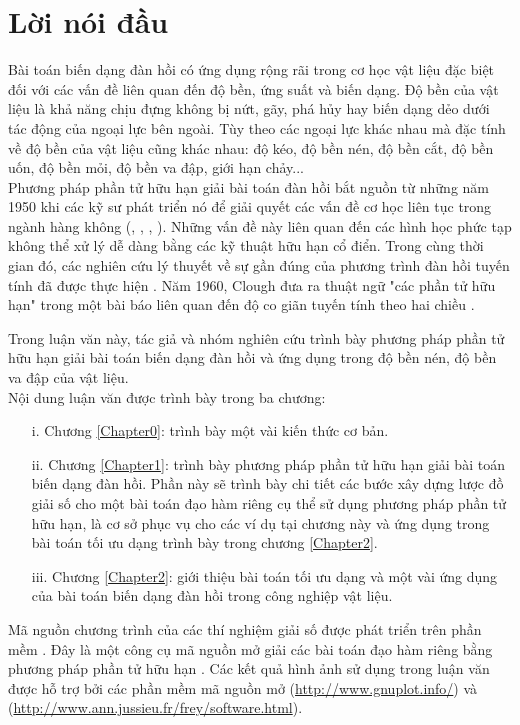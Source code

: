 \chapter*{\centering Lời nói đầu}
Bài toán biến dạng đàn hồi có ứng dụng rộng rãi trong cơ học vật liệu đặc biệt đối với các vấn đề liên quan đến độ bền, ứng suất và biến dạng. Độ bền của vật liệu là khả năng chịu đựng không bị nứt, gãy, phá hủy hay biến dạng dẻo dưới tác động của ngoại lực bên ngoài. Tùy theo các ngoại lực khác nhau mà đặc tính về độ bền của vật liệu cũng khác nhau: độ kéo, độ bền nén, độ bền cắt, độ bền uốn, độ bền mỏi, độ bền va đập, giới hạn chảy...\\
Phương pháp phần tử hữu hạn giải bài toán đàn hồi bắt nguồn từ những năm 1950 khi các kỹ sư phát triển nó để giải quyết các vấn đề cơ học liên tục trong ngành hàng không (\cite{Lev53}, \cite{ArK67}, \cite{ArK66}, \cite{Ode91}). Những vấn đề này liên quan đến các hình học phức tạp không thể xử lý dễ dàng bằng các kỹ thuật hữu hạn cổ điển. Trong cùng thời gian đó, các nghiên cứu lý thuyết về sự gần đúng của phương trình đàn hồi tuyến tính đã được thực hiện \cite{TuC56}. Năm 1960, Clough đưa ra thuật ngữ "các phần tử hữu hạn" trong một bài báo liên quan đến độ co giãn tuyến tính theo hai chiều \cite{Clo60}.

Trong luận văn này, tác giả và nhóm nghiên cứu trình bày phương pháp phần tử hữu hạn giải bài toán biến dạng đàn hồi và ứng dụng trong độ bền nén, độ bền va đập của vật liệu. \\[-0.5cm]

Nội dung luận văn được trình bày trong ba chương:
\begin{itemize}
\item[i.] Chương \ref{Chapter0}: trình bày một vài kiến thức cơ bản.
\item[ii.] Chương \ref{Chapter1}: trình bày phương pháp phần tử hữu hạn giải bài toán biến dạng đàn hồi. Phần này sẽ trình bày chi tiết các bước xây dựng lược đồ giải số cho một bài toán đạo hàm riêng cụ thể sử dụng phương pháp phần tử hữu hạn, là cơ sở phục vụ cho các ví dụ tại chương này và ứng dụng trong bài toán tối ưu dạng trình bày trong chương \ref{Chapter2}.
\item[iii.] Chương \ref{Chapter2}: giới thiệu bài toán tối ưu dạng và một vài ứng dụng của bài toán biến dạng đàn hồi trong công nghiệp vật liệu.
\end{itemize}

Mã nguồn chương trình của các thí nghiệm giải số được phát triển trên phần mềm . Đây là một công cụ mã nguồn mở giải các bài toán đạo hàm riêng bằng phương pháp phần tử hữu hạn \cite{Hec12}. Các kết quả hình ảnh sử dụng trong luận văn được hỗ trợ bởi các phần mềm mã nguồn mở  (\url{http://www.gnuplot.info/}) và  (\url{http://www.ann.jussieu.fr/frey/software.html}).\\[-0.5cm]

